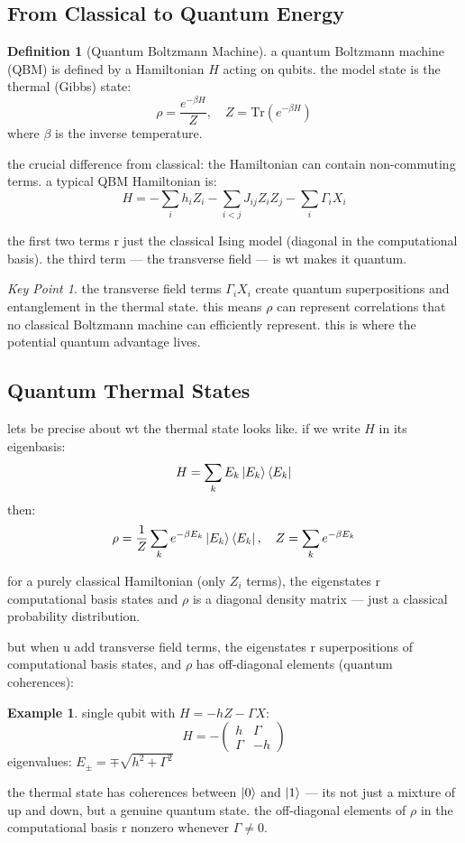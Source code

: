 \documentclass[11pt,a4paper]{article}
\theoremstyle{definition}
\newtheorem{definition}{Definition}[section]
\newtheorem{example}{Example}[section]
\theoremstyle{remark}
\newtheorem*{keypoint}{Key Point}
\begin{document}
\subsection{From Classical to Quantum Energy}

\begin{definition}[Quantum Boltzmann Machine]
a quantum Boltzmann machine (QBM) is defined by a Hamiltonian $H$ acting on qubits. the model state is the thermal (Gibbs) state:
\[
\rho = \frac{e^{-\beta H}}{Z}, \quad Z = \mathrm{Tr}(e^{-\beta H})
\]
where $\beta$ is the inverse temperature.
\end{definition}

the crucial difference from classical: the Hamiltonian can contain non-commuting terms. a typical QBM Hamiltonian is:
\[
H = -\sum_{i} h_i Z_i - \sum_{i<j} J_{ij} Z_i Z_j - \sum_{i} \Gamma_i X_i
\]

the first two terms r just the classical Ising model (diagonal in the computational basis). the third term --- the transverse field --- is wt makes it quantum.

\begin{keypoint}
the transverse field terms $\Gamma_i X_i$ create quantum superpositions and entanglement in the thermal state. this means $\rho$ can represent correlations that no classical Boltzmann machine can efficiently represent. this is where the potential quantum advantage lives.
\end{keypoint}

\subsection{Quantum Thermal States}

lets be precise about wt the thermal state looks like. if we write $H$ in its eigenbasis:
\[
H = \sum_k E_k \ket{E_k}\bra{E_k}
\]
then:
\[
\rho = \frac{1}{Z} \sum_k e^{-\beta E_k} \ket{E_k}\bra{E_k}, \quad Z = \sum_k e^{-\beta E_k}
\]

for a purely classical Hamiltonian (only $Z_i$ terms), the eigenstates r computational basis states and $\rho$ is a diagonal density matrix --- just a classical probability distribution.

but when u add transverse field terms, the eigenstates r superpositions of computational basis states, and $\rho$ has off-diagonal elements (quantum coherences):

\begin{example}
single qubit with $H = -h Z - \Gamma X$:
\[
H = -\begin{pmatrix} h & \Gamma \\ \Gamma & -h \end{pmatrix}
\]
eigenvalues: $E_\pm = \mp \sqrt{h^2 + \Gamma^2}$

the thermal state has coherences between $\ket{0}$ and $\ket{1}$ --- its not just a mixture of up and down, but a genuine quantum state. the off-diagonal elements of $\rho$ in the computational basis r nonzero whenever $\Gamma \neq 0$.
\end{example}
\end{document}
